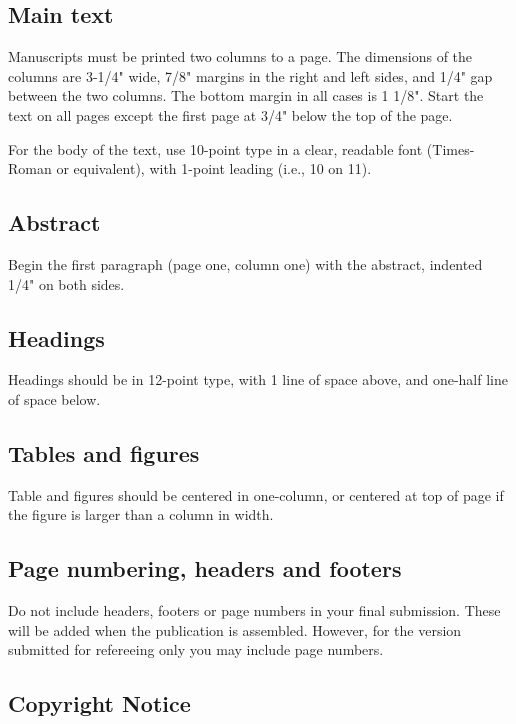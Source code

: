\documentclass{vldb}
\begin{document}
\subsection{Main text}

Manuscripts must be printed two columns to a page.  The dimensions of
the columns are 3-1/4" wide, 7/8" margins in the right and left sides,
and 1/4" gap between the two columns.  The bottom margin in all cases is
1 1/8". Start the text on all pages except the first page at 3/4" below
the top of the page.

For the body of the text, use 10-point type in a clear, readable font
(Times-Roman or equivalent), with 1-point leading (i.e., 10 on 11).

\subsection{Abstract}

Begin the first paragraph (page one, column one) with the abstract,
indented 1/4" on both sides.

\subsection{Headings}

Headings should be in 12-point type, with 1 line of space above, and
one-half line of space below.

\subsection{Tables and figures}

Table and figures should be centered in one-column, or centered at top
of page if the figure is larger than a column in width.


\subsection{Page numbering, headers and footers}

Do not include headers, footers or page numbers in your final
submission. These will be added when the publication is assembled.
However, for the version submitted for refereeing only you may include
page numbers.

\subsection{Copyright Notice}
\end{document}
